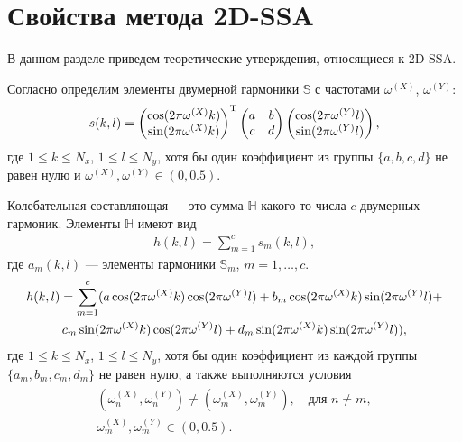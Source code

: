 \documentclass[specialist,
               substylefile = spbu.rtx,
               subf,href,colorlinks=true, 12pt]{disser}
\begin{document}
\section{Свойства метода 2D-SSA}
\label{sec:2d_ssa_theory}
В данном разделе приведем теоретические утверждения, относящиеся к 2D-SSA.

Согласно \cite{Golyandina.Usevich2010} определим элементы двумерной гармоники $\mathbb{S}$ с частотами $\omega^{(X)}$, $\omega^{(Y)}$:
\begin{gather} \label{eq:2d_cos_el}
\notag
s(k,l) =  \left(
\begin{matrix}
\cos(2\pi \omega^{(X)}k) \\ \notag
\sin(2\pi \omega^{(X)}k)
\end{matrix}
\right)^{\mathrm{T}}
 \left(
\begin{matrix}
a & b \\
c & d
\end{matrix}
\right)
 \left(
\begin{matrix}
\cos(2\pi \omega^{(Y)}l) \\ \notag
\sin(2\pi \omega^{(Y)}l)
\end{matrix}
\right),
\notag
\end{gather}
где $1 \leqslant k \leqslant N_x$, $1 \leqslant l \leqslant N_y$, хотя бы один коэффициент из  группы $\{a,b,c,d\}$ не равен нулю и
$\omega^{(X)}, \omega^{(Y)} \in (0,0.5)$.

Колебательная составляющая --- это сумма $\mathbb{H}$ какого-то числа $c$ двумерных гармоник. Элементы $\mathbb{H}$ имеют вид
\begin{gather} \label{eq:2d_cos}
h(k,l) = \sum_{m=1}^{c}{s_m(k,l)},
\end{gather}
где $a_m(k,l)$ --- элементы гармоники $\mathbb{S}_m$, $m=1,\ldots,c$.
\begin{gather}
\notag
h(k,l) = \sum_{m=1}^{c}(a \cos(2\pi \omega^{(X)}k) \cos(2\pi \omega^{(Y)}l) +
b_m \cos(2\pi \omega^{(X)}k) \sin(2\pi \omega^{(Y)}l) + \\ \label{eq:2d_cos_el}
c_m \sin(2\pi \omega^{(X)}k) \cos(2\pi \omega^{(Y)}l) +
d_m \sin(2\pi \omega^{(X)}k) \sin(2\pi \omega^{(Y)}l)),
\end{gather}
где $1 \leqslant k \leqslant N_x$, $1 \leqslant l \leqslant N_y$, хотя бы один коэффициент из каждой группы $\{a_m,b_m,c_m,d_m\}$ не равен нулю, а также выполняются условия
\begin{align} \label{eq:2d_omega}
\begin{matrix}
(\omega_n^{(X)}, \omega_n^{(Y)}) \not = (\omega_m^{(X)}, \omega_m^{(Y)}), \quad \text{для } n \not= m,\\
\omega_m^{(X)}, \omega_m^{(Y)} \in (0,0.5).
\end{matrix}
\end{align}
\end{document}
